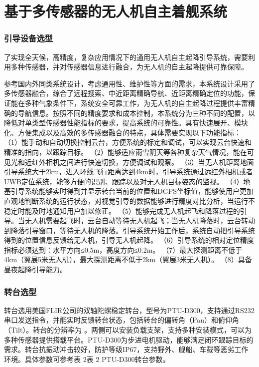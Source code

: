 \chapter{基于多传感器的无人机自主着舰系统}

\subsection{引导设备选型}
了实现全天候，高精度，复杂应用情况下的通用无人机自主起降引导系统，需要利用多种传感器，并对传感器信息进行融合，为无人机的自主起降提供可靠保障。

参考国内外同类系统设计，考虑通用性、维护性等方面的需求，本系统设计采用了多传感器融合，综合了远程搜索、中近距离精确导航、近距离精确定位的功能，保证能在多种气象条件下，系统安全可靠工作，为无人机的自主起降过程提供丰富精确的导航信息。按照不同的精度要求和成本控制，本系统分为三种不同的配置，以降低对单类型传感器性能指标的要求，提高系统的可靠性。具有快速展开、模块化、方便集成以及高效的多传感器融合的特点，具体需要实现以下功能指标：
（1）能手动和自动切换控制云台，方便系统的标定和调试，可以实现云台快速和精准的指向，以跟踪目标。
（2）能够适应雨雪阴天等各种复杂天气情况，能在可见光和近红外相机之间进行快速切换，方便调试和观察。
（3）当无人机距离地面引导系统大于2km，进入环线飞行距离达到4km时，引导系统通过远红外相机或者UWB定位系统，能够方便的识别、跟踪以及对无人机目标姿态的监视。
（4）地基引导系统能够实时得到并显示转台当前的位置和DGPS坐标值，能够使用户更加直观地判断系统的运行状态，对视觉引导的数据能够进行精度对比分析，当运行不稳定时能及时地通知用户加以修正。
（5）能够完成无人机起飞和降落过程的引导。当无人机需要起飞时，云台自动等待无人机起飞；当无人机降落时，云台转动到降落引导窗口，等待无人机的降落。引导系统开始工作后，系统自动把引导系统得到的位置信息反馈给无人机，引导无人机起降。
（6）引导系统的相对定位精度指标必须达到：水平方向≤0.5m，高度方向≤0.2m。
（7）最大探测距离不低于4km（翼展5米无人机），最大探测距离不低于2km（翼展3米无人机）。
（8）具备昼夜起降引导能力。


\subsection{转台选型}
转台选用美国FLIR公司的双轴陀螺稳定转台，型号为PTU-D300，支持通过RS232串口发送指令，并能实时反馈转台状态，包括转台的偏转角（Pan）和俯仰角（Tilt）。转台的分辨率为 。两侧可以安装负载支架，支持多种安装模式，可以为多种传感器提供搭载平台。PTU-D300为步进电机驱动，能够满足闭环跟踪目标的需求。转台抗振动冲击较好，防护等级IP67，支持野外、舰船、车载等恶劣工作环境。具体参数可参考表 2表 2 PTU-D300转台参数。


